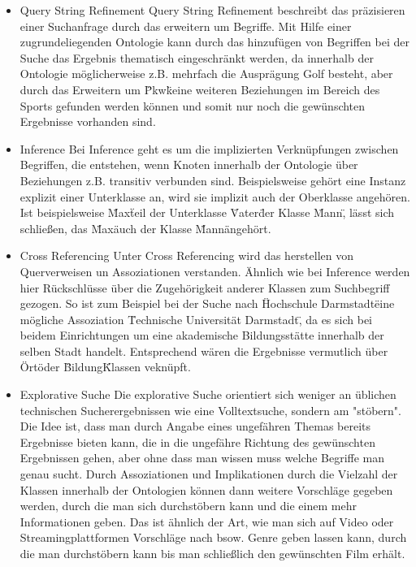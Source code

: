 \begin{itemize}
    \item Query String Refinement\newline
          Query String Refinement beschreibt das präzisieren einer Suchanfrage durch das erweitern um Begriffe. Mit Hilfe einer zugrundeliegenden Ontologie kann durch das hinzufügen von Begriffen bei der Suche das Ergebnis thematisch eingeschränkt werden, da innerhalb der Ontologie möglicherweise z.B. mehrfach die Ausprägung Golf besteht, aber durch das Erweitern um \"Pkw\" keine weiteren Beziehungen im Bereich des Sports gefunden werden können und somit nur noch die gewünschten Ergebnisse vorhanden sind. 
    \item Inference\newline
          Bei Inference geht es um die implizierten Verknüpfungen zwischen Begriffen, die entstehen, wenn Knoten innerhalb der Ontologie über Beziehungen z.B. transitiv verbunden sind. Beispielsweise gehört eine Instanz explizit einer Unterklasse an, wird sie implizit auch der Oberklasse angehören. Ist beispielsweise \"Max\" teil der Unterklasse \"Vater\" der Klasse \"Mann\", lässt sich schließen, das \"Max\" auch der Klasse \"Mann\" angehört.
    \item Cross Referencing\newline
          Unter Cross Referencing wird das herstellen von Querverweisen un Assoziationen verstanden. Ähnlich wie bei Inference werden hier Rückschlüsse über die Zugehörigkeit anderer Klassen zum Suchbegriff gezogen. So ist zum Beispiel bei der Suche nach \"Hochschule Darmstadt\" eine mögliche Assoziation \"Technische Universität Darmstadt\", da es sich bei beidem Einrichtungen um eine akademische Bildungsstätte innerhalb der selben Stadt handelt. Entsprechend wären die Ergebnisse vermutlich über \"Ort\" oder \"Bildung\" Klassen veknüpft.
    \item Explorative Suche\newline
          Die explorative Suche orientiert sich weniger an üblichen technischen Sucherergebnissen wie eine Volltextsuche, sondern am "stöbern". Die Idee ist, dass man durch Angabe eines ungefähren Themas bereits Ergebnisse bieten kann, die in die ungefähre Richtung des gewünschten Ergebnissen gehen, aber ohne dass man wissen muss welche Begriffe man genau sucht. Durch Assoziationen und Implikationen durch die Vielzahl der Klassen innerhalb der Ontologien können dann weitere Vorschläge gegeben werden, durch die man sich durchstöbern kann und die einem mehr Informationen geben. Das ist ähnlich der Art, wie man sich auf Video oder Streamingplattformen Vorschläge nach bsow. Genre geben lassen kann, durch die man durchstöbern kann bis man schließlich den gewünschten Film erhält.
\end{itemize}

